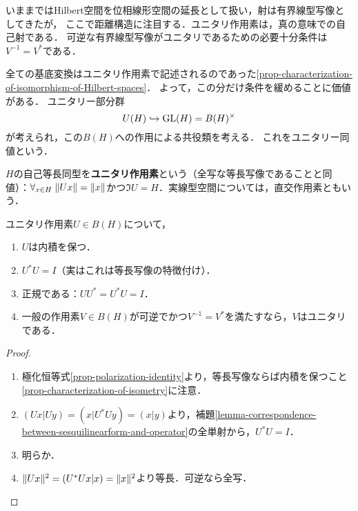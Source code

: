 \documentclass[uplatex,dvipdfmx]{jsreport}
\begin{document}
\begin{tcolorbox}[colframe=ForestGreen, colback=ForestGreen!10!white,breakable,colbacktitle=ForestGreen!40!white,coltitle=black,fonttitle=\bfseries\sffamily,
title=ユニタリ作用素]
    いままではHilbert空間を位相線形空間の延長として扱い，射は有界線型写像としてきたが，
    ここで距離構造に注目する．ユニタリ作用素は，真の意味での自己射である．
    可逆な有界線型写像がユニタリであるための必要十分条件は$V^{-1}=V^*$である．

    全ての基底変換はユニタリ作用素で記述されるのであった\ref{prop-characterization-of-isomorphism-of-Hilbert-spaces}．
    よって，この分だけ条件を緩めることに価値がある．
    ユニタリー部分群
    \[U(H)\hookrightarrow\mathrm{GL}(H)=B(H)^\times\]
    が考えられ，この$B(H)$への作用による共役類を考える．
    これをユニタリー同値という．
\end{tcolorbox}

\begin{definition}
    $H$の自己等長同型を\textbf{ユニタリ作用素}という（全写な等長写像であることと同値）：$\forall_{x\in H}\;\|Ux\|=\|x\|$かつ$\Im U=H$．実線型空間については，直交作用素ともいう．
\end{definition}

\begin{lemma}[ユニタリ作用素の特徴付け]\label{lemma-characterization-of-unitary-operator}
    ユニタリ作用素$U\in B(H)$について，
    \begin{enumerate}
        \item $U$は内積を保つ．
        \item $U^*U=I$（実はこれは等長写像の特徴付け）．
        \item 正規である：$UU^*=U^*U=I$．
        \item 一般の作用素$V\in B(H)$が可逆でかつ$V^{-1}=V^*$を満たすなら，$V$はユニタリである．
    \end{enumerate}
\end{lemma}
\begin{proof}\mbox{}
    \begin{enumerate}
        \item 極化恒等式\ref{prop-polarization-identity}より，等長写像ならば内積を保つこと\ref{prop-characterization-of-isometry}に注意．
        \item $(Ux|Uy)=(x|U^*Uy)=(x|y)$より，補題\ref{lemma-correspondence-between-sesquilinearform-and-operator}の全単射から，$U^*U=I$．
        \item 明らか．
        \item $\|Ux\|^2=(U^*Ux|x)=\|x\|^2$より等長．可逆なら全写．
    \end{enumerate}
\end{proof}
\end{document}
